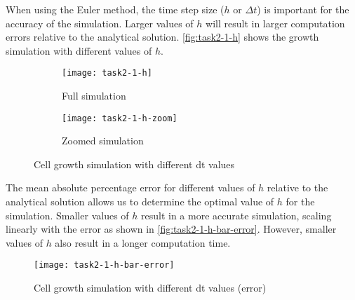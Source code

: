 
When using the Euler method, the time step size ($h$ or $\Delta t$) is important for the accuracy of the simulation.
Larger values of $h$ will result in larger computation errors relative to the analytical solution.
\autoref{fig:task2-1-h} shows the growth  simulation with different values of $h$.

\begin{figure}[ht]
    \centering
    \begin{subfigure}{\textwidth}
        \centering
        \texttt{[image: task2-1-h]}
        \caption[Full simulation]{Full simulation}
        \label{fig:task2-1-h-full}
    \end{subfigure}

    \begin{subfigure}{\textwidth}
        \centering
        \texttt{[image: task2-1-h-zoom]}
        \caption[Zoomed simulation]{Zoomed simulation}
        \label{fig:task2-1-h-zoom}
    \end{subfigure}
    \caption[Cell growth simulation with different dt values]{Cell growth simulation with different dt values}
    \label{fig:task2-1-h}
\end{figure}

The mean absolute percentage error for different values of $h$ relative to the analytical solution allows us to determine the optimal value of $h$ for the simulation.
Smaller values of $h$ result in a more accurate simulation, scaling linearly with the error as shown in \autoref{fig:task2-1-h-bar-error}.
However, smaller values of $h$ also result in a longer computation time.

\begin{figure}[!ht]
    \centering
    \texttt{[image: task2-1-h-bar-error]}
    \caption[Cell growth simulation with different dt values (error)]{Cell growth simulation with different dt values (error)}
    \label{fig:task2-1-h-bar-error}
\end{figure}



